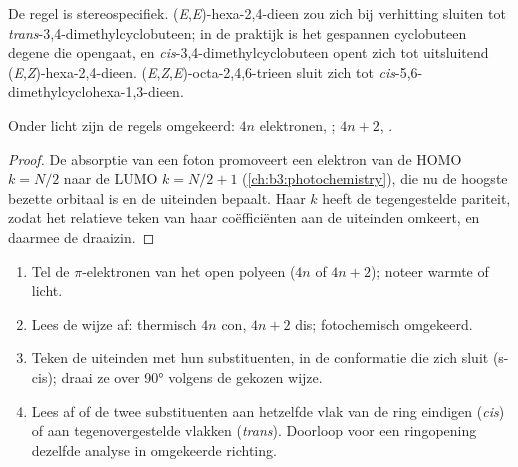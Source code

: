 De regel is stereospecifiek. (\textit{E},\textit{E})-hexa-2,4-dieen zou zich bij
verhitting  sluiten tot \textit{trans}-3,4-dimethylcyclobuteen; in de praktijk is het
gespannen cyclobuteen degene die opengaat, en
\textit{cis}-3,4-dimethylcyclobuteen opent zich  tot
uitsluitend (\textit{E},\textit{Z})-hexa-2,4-dieen. (\textit{E},\textit{Z},\textit{E})-octa-2,4,6-trieen sluit zich
 tot \textit{cis}-5,6-dimethylcyclohexa-1,3-dieen.

\begin{proposition}\label{prop:b3:pericyclic:photo-electrocyclic}
Onder licht zijn de regels omgekeerd: $4n$ elektronen, ; $4n + 2$, .
\end{proposition}

\begin{proof}
De absorptie van een foton promoveert een elektron van de HOMO $k = N/2$ naar de LUMO $k = N/2 + 1$
(\cref{ch:b3:photochemistry}), die nu de hoogste bezette orbitaal is en
de uiteinden bepaalt. Haar $k$ heeft de tegengestelde pariteit, zodat het relatieve teken van haar
coëfficiënten aan de uiteinden omkeert, en daarmee de draaizin.
\end{proof}

\begin{method}\label{met:b3:pericyclic:predict-stereo}
\begin{enumerate}
  \item Tel de $\pi$-elektronen van het open polyeen ($4n$ of $4n + 2$); noteer warmte of
        licht.
  \item Lees de wijze af: thermisch $4n$ con, $4n + 2$ dis; fotochemisch omgekeerd.
  \item Teken de uiteinden met hun substituenten, in de conformatie die
        zich sluit (s-cis); draai ze over 90° volgens de gekozen wijze.
  \item Lees af of de twee substituenten aan hetzelfde vlak van de ring
        eindigen (\textit{cis}) of aan tegenovergestelde vlakken (\textit{trans}). Doorloop voor een
        ringopening dezelfde analyse in omgekeerde richting.
\end{enumerate}
\end{method}

